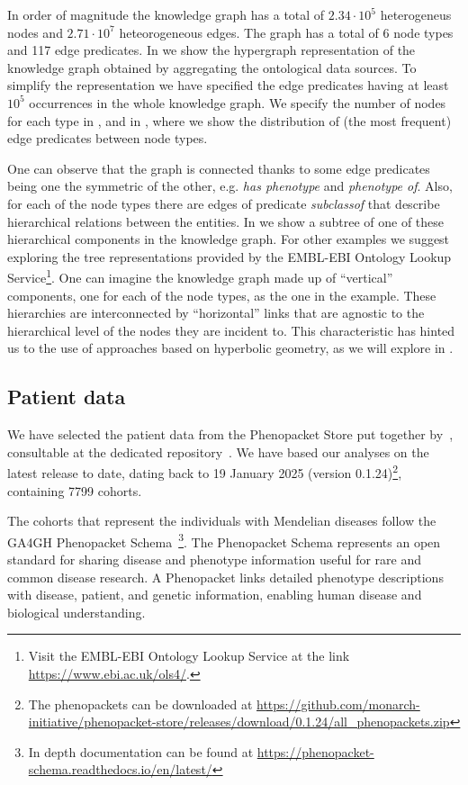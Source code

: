 In order of magnitude the knowledge graph has a total of $2.34\cdot10^5$ heterogeneus nodes and $2.71\cdot10^7$ heteorogeneous edges. The graph has a total of 6 node types and 117 edge predicates. In  we show the hypergraph representation of the knowledge graph obtained by aggregating the ontological data sources. To simplify the representation we have specified the edge predicates having at least $10^5$ occurrences in the whole knowledge graph. We specify the number of nodes for each type in , and in , where we show the distribution of (the most frequent) edge predicates between node types.


One can observe that the graph is connected thanks to some edge predicates being one the symmetric of the other, e.g. \emph{has phenotype} and \emph{phenotype of}. Also, for each of the node types there are edges of predicate \emph{subclassof} that describe hierarchical relations between the entities. In  we show a subtree of one of these hierarchical components in the knowledge graph. For other examples we suggest exploring the tree representations provided by the EMBL-EBI Ontology Lookup Service\footnote{Visit the EMBL-EBI Ontology Lookup Service at the link \url{https://www.ebi.ac.uk/ols4/}.}. One can imagine the knowledge graph made up of ``vertical'' components, one for each of the node types, as the one in the example. These hierarchies are interconnected by ``horizontal'' links that are agnostic to the hierarchical level of the nodes they are incident to. This characteristic has hinted us to the use of approaches based on hyperbolic geometry, as we will explore in .

\subsection{Patient data}
We have selected the patient data from the Phenopacket Store put together by~\cite{Danis2025Phenopackets}, consultable at the dedicated repository~\cite{Robinson2024PhenopacketStore}. We have based our analyses on the latest release to date, dating back to 19 January 2025 (version 0.1.24)\footnote{The phenopackets can be downloaded at \url{https://github.com/monarch-initiative/phenopacket-store/releases/download/0.1.24/all_phenopackets.zip}}, containing 7799 cohorts. 

The cohorts that represent the individuals with Mendelian diseases follow the GA4GH Phenopacket Schema~\cite{jacobsen2022ga4ghPhenopacketSchema}\footnote{In depth documentation can be found at \url{https://phenopacket-schema.readthedocs.io/en/latest/}}. The Phenopacket Schema represents an open standard for sharing disease and phenotype information useful for rare and common disease research. A Phenopacket links detailed phenotype descriptions with disease, patient, and genetic information, enabling human disease and biological understanding. 

